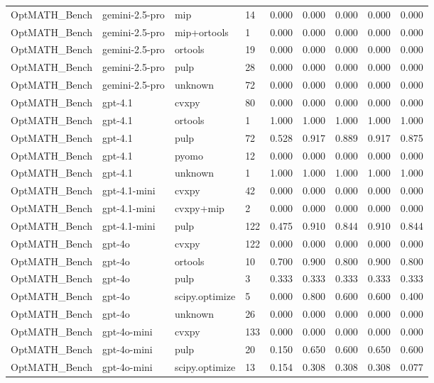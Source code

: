 \begin{table}[t]
\begin{tabular}{lllllllll}
OptMATH\_Bench & gemini-2.5-pro & mip & 14 & 0.000 & 0.000 & 0.000 & 0.000 & 0.000 \\
OptMATH\_Bench & gemini-2.5-pro & mip+ortools & 1 & 0.000 & 0.000 & 0.000 & 0.000 & 0.000 \\
OptMATH\_Bench & gemini-2.5-pro & ortools & 19 & 0.000 & 0.000 & 0.000 & 0.000 & 0.000 \\
OptMATH\_Bench & gemini-2.5-pro & pulp & 28 & 0.000 & 0.000 & 0.000 & 0.000 & 0.000 \\
OptMATH\_Bench & gemini-2.5-pro & unknown & 72 & 0.000 & 0.000 & 0.000 & 0.000 & 0.000 \\
OptMATH\_Bench & gpt-4.1 & cvxpy & 80 & 0.000 & 0.000 & 0.000 & 0.000 & 0.000 \\
OptMATH\_Bench & gpt-4.1 & ortools & 1 & 1.000 & 1.000 & 1.000 & 1.000 & 1.000 \\
OptMATH\_Bench & gpt-4.1 & pulp & 72 & 0.528 & 0.917 & 0.889 & 0.917 & 0.875 \\
OptMATH\_Bench & gpt-4.1 & pyomo & 12 & 0.000 & 0.000 & 0.000 & 0.000 & 0.000 \\
OptMATH\_Bench & gpt-4.1 & unknown & 1 & 1.000 & 1.000 & 1.000 & 1.000 & 1.000 \\
OptMATH\_Bench & gpt-4.1-mini & cvxpy & 42 & 0.000 & 0.000 & 0.000 & 0.000 & 0.000 \\
OptMATH\_Bench & gpt-4.1-mini & cvxpy+mip & 2 & 0.000 & 0.000 & 0.000 & 0.000 & 0.000 \\
OptMATH\_Bench & gpt-4.1-mini & pulp & 122 & 0.475 & 0.910 & 0.844 & 0.910 & 0.844 \\
OptMATH\_Bench & gpt-4o & cvxpy & 122 & 0.000 & 0.000 & 0.000 & 0.000 & 0.000 \\
OptMATH\_Bench & gpt-4o & ortools & 10 & 0.700 & 0.900 & 0.800 & 0.900 & 0.800 \\
OptMATH\_Bench & gpt-4o & pulp & 3 & 0.333 & 0.333 & 0.333 & 0.333 & 0.333 \\
OptMATH\_Bench & gpt-4o & scipy.optimize & 5 & 0.000 & 0.800 & 0.600 & 0.600 & 0.400 \\
OptMATH\_Bench & gpt-4o & unknown & 26 & 0.000 & 0.000 & 0.000 & 0.000 & 0.000 \\
OptMATH\_Bench & gpt-4o-mini & cvxpy & 133 & 0.000 & 0.000 & 0.000 & 0.000 & 0.000 \\
OptMATH\_Bench & gpt-4o-mini & pulp & 20 & 0.150 & 0.650 & 0.600 & 0.650 & 0.600 \\
OptMATH\_Bench & gpt-4o-mini & scipy.optimize & 13 & 0.154 & 0.308 & 0.308 & 0.308 & 0.077 \\

\end{tabular}
\end{table}
